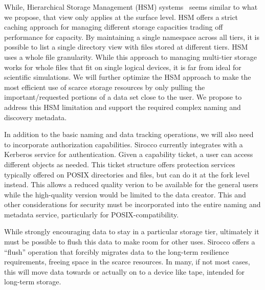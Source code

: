 While, Hierarchical Storage Management (HSM) systems~\cite{blaze:1992:hsm}
seems similar to what we propose, that view only applies at the surface level.
HSM offers a strict caching approach for managing different storage capacities
trading off performance for capacity.  By maintaining a single namespace across
all tiers, it is possible to list a single directory view with files stored at
different tiers. HSM uses a whole file granularity. While this approach to
managing multi-tier storage works for whole files that fit on single logical
devices, it is far from ideal for scientific simulations. We will further
optimize the HSM approach to make the most efficient use of scarce storage
resources by only pulling the important/requested portions of a data set close
to the user. We propose to address this HSM limitation and support the required
complex naming and discovery metadata.

In addition to the basic naming and data tracking operations, we will also need
to incorporate authorization capabilities. Sirocco currently integrates with a
Kerberos service for authentication. Given a capability ticket, a user can
access different objects as needed. This ticket structure offers protection
services typically offered on POSIX directories and files, but can do it at the
fork level instead. This allows a reduced quality verion to be available
for the general users while the high-quality version would be limited to the
data creator. This and other considerations for security must be incorporated
into the entire naming and metadata service, particularly for
POSIX-compatibility.

While strongly encouraging data to stay in a particular storage tier,
ultimately it must be possible to flush this data to make room for other uses.
Sirocco offers a ``flush'' operation that forcibly migrates data to the
long-term resilience requirements, freeing space in the scarce resources. In
many, if not most cases, this will move data towards or actually on to a device
like tape, intended for long-term storage.

